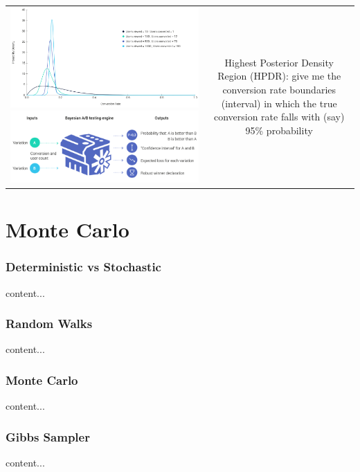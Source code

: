 \documentclass{beamer}
\begin{document}
\begin{frame}[allowframebreaks]
\begin{tabular}{c|c}
\includegraphics[scale=0.2]{figs/abtestbayes} \includegraphics[scale=0.3]{figs/abtestbayesengine}
& Highest Posterior Density Region (HPDR): give me the conversion rate boundaries (interval) in which the true conversion rate falls with (say) 95\% probability
\end{tabular}


\end{frame}

\section{Monte Carlo}

\begin{frame}\frametitle{Deterministic vs Stochastic}
	content...
\end{frame}

\begin{frame}\frametitle{Random Walks}
content...
\end{frame}

\begin{frame}\frametitle{Monte Carlo}
content...
\end{frame}

\begin{frame}\frametitle{Gibbs Sampler}
content...
\end{frame}
\end{document}
